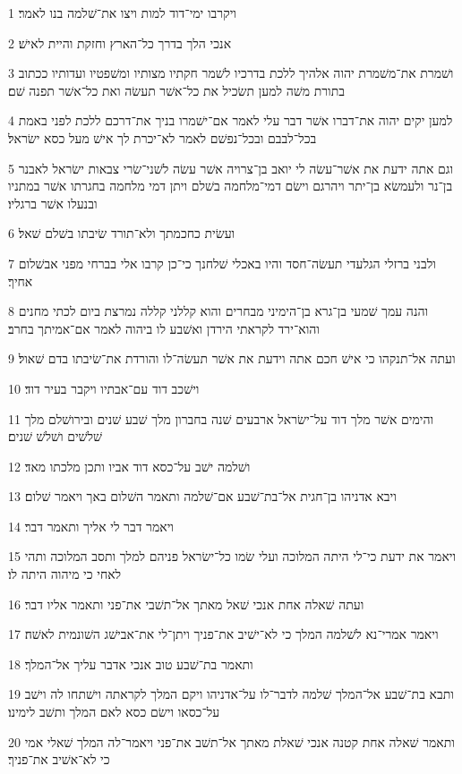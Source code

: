 \par 1 ויקרבו ימי־דוד למות ויצו את־שׁלמה בנו לאמר׃
\par 2 אנכי הלך בדרך כל־הארץ וחזקת והיית לאישׁ׃
\par 3 ושׁמרת את־משׁמרת יהוה אלהיך ללכת בדרכיו לשׁמר חקתיו מצותיו ומשׁפטיו ועדותיו ככתוב בתורת משׁה למען תשׂכיל את כל־אשׁר תעשׂה ואת כל־אשׁר תפנה שׁם׃
\par 4 למען יקים יהוה את־דברו אשׁר דבר עלי לאמר אם־ישׁמרו בניך את־דרכם ללכת לפני באמת בכל־לבבם ובכל־נפשׁם לאמר לא־יכרת לך אישׁ מעל כסא ישׂראל׃
\par 5 וגם אתה ידעת את אשׁר־עשׂה לי יואב בן־צרויה אשׁר עשׂה לשׁני־שׂרי צבאות ישׂראל לאבנר בן־נר ולעמשׂא בן־יתר ויהרגם וישׂם דמי־מלחמה בשׁלם ויתן דמי מלחמה בחגרתו אשׁר במתניו ובנעלו אשׁר ברגליו׃
\par 6 ועשׂית כחכמתך ולא־תורד שׂיבתו בשׁלם שׁאל׃
\par 7 ולבני ברזלי הגלעדי תעשׂה־חסד והיו באכלי שׁלחנך כי־כן קרבו אלי בברחי מפני אבשׁלום אחיך׃
\par 8 והנה עמך שׁמעי בן־גרא בן־הימיני מבחרים והוא קללני קללה נמרצת ביום לכתי מחנים והוא־ירד לקראתי הירדן ואשׁבע לו ביהוה לאמר אם־אמיתך בחרב׃
\par 9 ועתה אל־תנקהו כי אישׁ חכם אתה וידעת את אשׁר תעשׂה־לו והורדת את־שׂיבתו בדם שׁאול׃
\par 10 וישׁכב דוד עם־אבתיו ויקבר בעיר דוד׃
\par 11 והימים אשׁר מלך דוד על־ישׂראל ארבעים שׁנה בחברון מלך שׁבע שׁנים ובירושׁלם מלך שׁלשׁים ושׁלשׁ שׁנים׃
\par 12 ושׁלמה ישׁב על־כסא דוד אביו ותכן מלכתו מאד׃
\par 13 ויבא אדניהו בן־חגית אל־בת־שׁבע אם־שׁלמה ותאמר השׁלום באך ויאמר שׁלום׃
\par 14 ויאמר דבר לי אליך ותאמר דבר׃
\par 15 ויאמר את ידעת כי־לי היתה המלוכה ועלי שׂמו כל־ישׂראל פניהם למלך ותסב המלוכה ותהי לאחי כי מיהוה היתה לו׃
\par 16 ועתה שׁאלה אחת אנכי שׁאל מאתך אל־תשׁבי את־פני ותאמר אליו דבר׃
\par 17 ויאמר אמרי־נא לשׁלמה המלך כי לא־ישׁיב את־פניך ויתן־לי את־אבישׁג השׁונמית לאשׁה׃
\par 18 ותאמר בת־שׁבע טוב אנכי אדבר עליך אל־המלך׃
\par 19 ותבא בת־שׁבע אל־המלך שׁלמה לדבר־לו על־אדניהו ויקם המלך לקראתה וישׁתחו לה וישׁב על־כסאו וישׂם כסא לאם המלך ותשׁב לימינו׃
\par 20 ותאמר שׁאלה אחת קטנה אנכי שׁאלת מאתך אל־תשׁב את־פני ויאמר־לה המלך שׁאלי אמי כי לא־אשׁיב את־פניך׃
